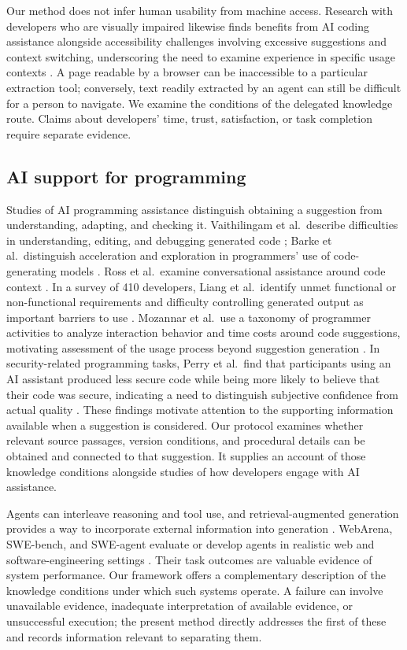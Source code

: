 \documentclass[manuscript,review,anonymous]{acmart}
\begin{document}
Our method does not infer human usability from machine access. Research with developers who are visually impaired likewise finds benefits from AI coding assistance alongside accessibility challenges involving excessive suggestions and context switching, underscoring the need to examine experience in specific usage contexts \citep{flores2025}. A page readable by a browser can be inaccessible to a particular extraction tool; conversely, text readily extracted by an agent can still be difficult for a person to navigate. We examine the conditions of the delegated knowledge route. Claims about developers' time, trust, satisfaction, or task completion require separate evidence.

\subsection{AI support for programming}\label{ai-support-for-programming}

Studies of AI programming assistance distinguish obtaining a suggestion from understanding, adapting, and checking it. Vaithilingam et al.~describe difficulties in understanding, editing, and debugging generated code \citep{vaithilingam2022}; Barke et al.~distinguish acceleration and exploration in programmers' use of code-generating models \citep{barke2023}. Ross et al.~examine conversational assistance around code context \citep{programmerAssistant2023}. In a survey of 410 developers, Liang et al.~identify unmet functional or non-functional requirements and difficulty controlling generated output as important barriers to use \citep{liang2024}. Mozannar et al.~use a taxonomy of programmer activities to analyze interaction behavior and time costs around code suggestions, motivating assessment of the usage process beyond suggestion generation \citep{mozannar2024}. In security-related programming tasks, Perry et al.~find that participants using an AI assistant produced less secure code while being more likely to believe that their code was secure, indicating a need to distinguish subjective confidence from actual quality \citep{perry2023}. These findings motivate attention to the supporting information available when a suggestion is considered. Our protocol examines whether relevant source passages, version conditions, and procedural details can be obtained and connected to that suggestion. It supplies an account of those knowledge conditions alongside studies of how developers engage with AI assistance.

Agents can interleave reasoning and tool use, and retrieval-augmented generation provides a way to incorporate external information into generation \citep{lewis2020, yao2023}. WebArena, SWE-bench, and SWE-agent evaluate or develop agents in realistic web and software-engineering settings \citep{zhou2024webarena, jimenez2024swebench, yang2024sweagent}. Their task outcomes are valuable evidence of system performance. Our framework offers a complementary description of the knowledge conditions under which such systems operate. A failure can involve unavailable evidence, inadequate interpretation of available evidence, or unsuccessful execution; the present method directly addresses the first of these and records information relevant to separating them.
\end{document}
